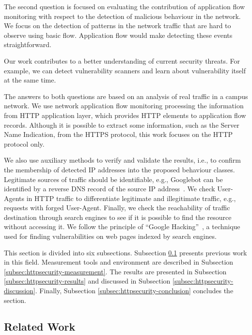 The second question is focused on evaluating the contribution of application flow monitoring with respect to the detection of malicious behaviour in the network. We focus on the detection of patterns in the network traffic that are hard to observe using basic flow. Application flow would make detecting these events straightforward.

Our work contributes to a better understanding of current security threats. For example, we can detect vulnerability scanners and learn about vulnerability itself at the same time.

The answers to both questions are based on an analysis of real traffic in a campus network. We use network application flow monitoring processing the information from HTTP application layer, which provides HTTP elements to application flow records. Although it is possible to extract some information, such as the Server Name Indication, from the HTTPS protocol, this work focuses on the HTTP protocol only.

We also use auxiliary methods to verify and validate the results, i.e., to confirm the membership of detected IP addresses into the proposed behaviour classes. Legitimate sources of traffic should be identifiable, e.g., Googlebot can be identified by a reverse DNS record of the source IP address~\cite{Google--Verifying}. We check User-Agents in HTTP traffic to differentiate legitimate and illegitimate traffic, e.g., requests with forged User-Agent. Finally, we check the reachability of traffic destination through search engines to see if it is possible to find the resource without accessing it. We follow the principle of ``Google Hacking''~\cite{Billig-2008-Evaluation}, a technique used for finding vulnerabilities on web pages indexed by search engines.

This section is divided into six subsections. Subsection \ref{subsec:httpsecurity-related_work} presents previous work in this field. Measurement tools and environment are described in Subsection \ref{subsec:httpsecurity-measurement}. The results are presented in Subsection \ref{subsec:httpsecurity-results} and discussed in Subsection \ref{subsec:httpsecurity-discussion}. Finally, Subsection \ref{subsec:httpsecurity-conclusion} concludes the section.

\subsection{Related Work}\label{subsec:httpsecurity-related_work}

